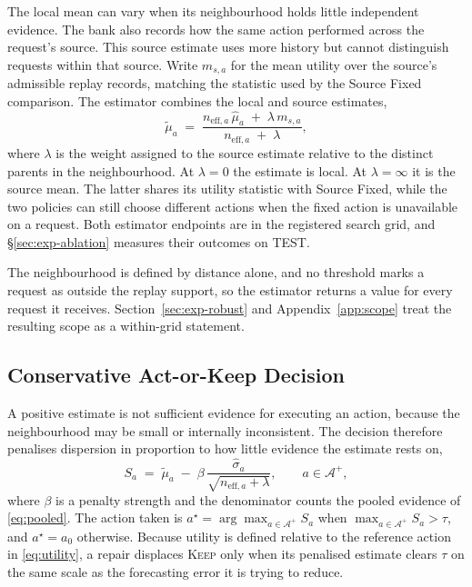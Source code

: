 \documentclass{article}
\newcommand{\calA}{\mathcal{A}}
\begin{document}
The local mean can vary when its neighbourhood holds little independent evidence. The bank
also records how the same action performed across the request's source. This source estimate
uses more history but cannot distinguish requests within that source. Write $m_{s,a}$ for the
mean utility over the source's admissible replay records, matching the statistic used by the
Source Fixed comparison. The estimator combines the local and source estimates,
\begin{equation}
  \tilde\mu_a \;=\; \frac{n_{\mathrm{eff},a}\,\hat\mu_a \;+\; \lambda\, m_{s,a}}
                          {n_{\mathrm{eff},a} \;+\; \lambda} ,
  \label{eq:pooled}
\end{equation}
where $\lambda$ is the weight assigned to the source estimate relative to the distinct
parents in the neighbourhood. At $\lambda=0$ the estimate is local. At
$\lambda=\infty$ it is the source mean. The latter shares its utility statistic with
Source Fixed, while the two policies can still choose different actions when the fixed
action is unavailable on a request. Both estimator endpoints are in the registered search
grid, and \S\ref{sec:exp-ablation} measures their outcomes on TEST.

The neighbourhood is defined by distance alone, and no threshold marks a request as outside the
replay support, so the estimator returns a value for every request it receives.
Section~\ref{sec:exp-robust} and Appendix~\ref{app:scope} treat the resulting scope as a
within-grid statement.

\subsection{Conservative Act-or-Keep Decision}
\label{sec:method-decision}
A positive estimate is not sufficient evidence for executing an action, because the
neighbourhood may be small or internally inconsistent. The decision therefore penalises
dispersion in proportion to how little evidence the estimate rests on,
\begin{equation}
  S_a \;=\; \tilde\mu_a \;-\; \beta\, \frac{\hat\sigma_a}{\sqrt{n_{\mathrm{eff},a} + \lambda}},
  \qquad a \in \calA^{+},
  \label{eq:score}
\end{equation}
where $\beta$ is a penalty strength and the denominator counts the pooled evidence of
\eqref{eq:pooled}. The action taken is $a^{\star} = \arg\max_{a \in \calA^{+}} S_a$ when
$\max_{a \in \calA^{+}} S_a > \tau$, and $a^{\star} = a_0$ otherwise. Because utility is
defined relative to the reference action in \eqref{eq:utility}, a repair displaces
\textsc{Keep} only when its penalised estimate clears $\tau$ on the same scale as the
forecasting error it is trying to reduce.
\end{document}
